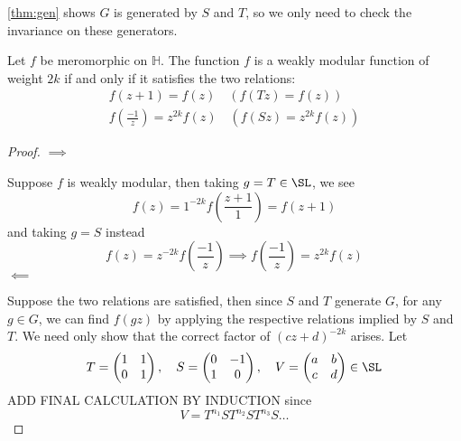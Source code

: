 \documentclass[12pt]{article}
\theoremstyle{definition}
\begin{document}
\cref{thm:gen} shows \(G\) is generated by \(S\) and \(T\), so  we only need to check the invariance on these generators.
\begin{prop}
Let \(f\) be meromorphic on \(\mathbb{H}\). The function \(f\) is a weakly modular function of weight \(2k\) if and only if it satisfies the two relations:
\begin{align*}
f(z+1) = f(z) \quad (f(Tz)=f(z))\\
f\left(\frac{-1}{z}\right) = z^{2k}f(z) \quad (f(Sz) = z^{2k}f(z))
\end{align*}
\end{prop}  
\begin{proof}
\(\implies\)

\smallskip 
Suppose \(f\) is weakly modular, then taking \(g = T \in \SL\), we see
\[
    f(z) = 1^{-2k} f\left(\frac{z+1}{1}\right) = f(z+1)
\] 
and taking \(g= S\) instead
\[
    f(z) = z^{-2k} f\left(\frac{-1}{z}\right) \implies f\left(\frac{-1}{z}\right) = z^{2k}f(z)
\] 
\(\impliedby\)

\smallskip
Suppose the two relations are satisfied, then since \(S\) and \(T\) generate \(G\), for any \(g\in G\), we can find \(f(gz)\) by applying the respective relations implied by \(S\) and \(T\). We need only show that the correct factor of \((cz+d)^{-2k}\) arises. 
Let 
\[
    T = \begin{pmatrix}
        1 &  1 \\
        0 &  1 \\
    \end{pmatrix}, \quad S = \begin{pmatrix}
        0 &  -1 \\
        1 &  0 \\
    \end{pmatrix}, \quad V = \begin{pmatrix}
        a & b  \\
        c & d  \\
    \end{pmatrix} \in \SL
\] 
ADD FINAL CALCULATION BY INDUCTION since
\[
    V = T^{n_1}S T^{n_2}S T^{n_3}S\dots
\] 
\end{proof}
\end{document}
